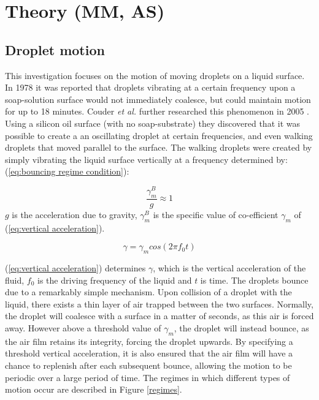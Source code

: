 \section{Theory (MM, AS)}\label{theory}
\subsection{Droplet motion}
This investigation focuses on the motion of moving droplets on a liquid surface. In 1978 it was reported \cite{Walker} that droplets vibrating at a certain frequency upon a soap-solution surface would not immediately coalesce, but could maintain motion for up to 18 minutes. Couder \textit{et al.} further researched this phenomenon in 2005 \cite{couder}. Using a silicon oil surface (with no soap-substrate) they discovered that it was possible to create a   an oscillating droplet at certain frequencies, and even walking droplets that moved parallel to the surface. 
The walking droplets were created by simply vibrating the liquid surface vertically at a frequency determined by: (\ref{eq:bouncing regime condition}):

\begin{equation} \label{eq:bouncing regime condition}
\frac{\gamma_{m}^{B}}{g}\approx 1
\end{equation}
$g$ is the acceleration due to gravity, $\gamma_{m}^{B}$ is the specific value of co-efficient $\gamma_{m}$ of (\ref{eq:vertical acceleration}).


\begin{equation} \label{eq:vertical acceleration}
\gamma=\gamma_{m}cos(2 \pi f_0t) 
\end{equation}

(\ref{eq:vertical acceleration}) determines $\gamma$, which is the vertical acceleration of the fluid, $f_0$ is the driving frequency of the liquid and $t$ is time. The droplets bounce due to a remarkably simple mechanism. Upon collision of a droplet with the liquid, there exists a thin layer of air trapped between the two surfaces. Normally, the droplet will coalesce with a surface in a matter of seconds, as this air is forced away. However above a threshold value of $\gamma_{m}$, the droplet will instead bounce, as the air film retains its integrity, forcing the droplet upwards. By specifying a threshold vertical acceleration, it is also ensured that the air film will have a chance to replenish after each subsequent bounce, allowing the motion to be periodic over a large period of time. The regimes in which different types of motion occur are described in Figure \ref{regimes}.

